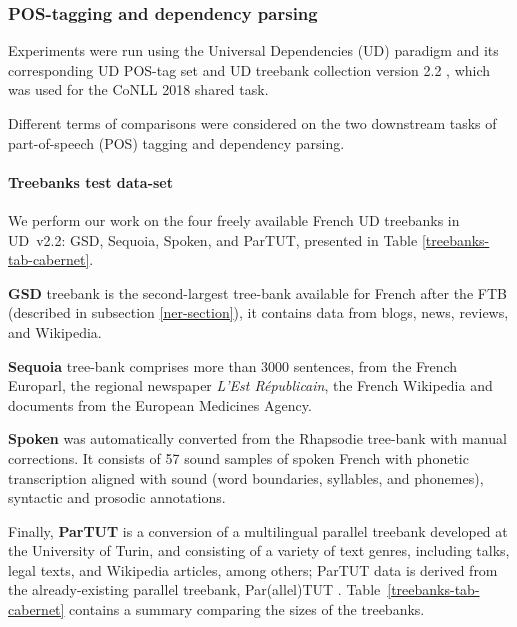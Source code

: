 

\subsubsection{POS-tagging and dependency parsing}


Experiments were run using the Universal Dependencies (UD) paradigm and its corresponding UD POS-tag set \citep{petrov-etal-2012-universal} and UD treebank collection version 2.2 \citep{nivre-etal-2018-universal}, which was used for the CoNLL 2018 shared task.

Different terms of comparisons were considered on the two downstream tasks of part-of-speech (POS) tagging and dependency parsing.
\paragraph{Treebanks test data-set}
We perform our work on the four freely available French UD treebanks in UD~v2.2: GSD, Sequoia, Spoken, and ParTUT, presented in Table \ref{treebanks-tab-cabernet}.

\textbf{GSD} treebank \citep{mcdonald-etal-2013-universal} is the second-largest tree-bank available for French after the FTB (described in subsection \ref{ner-section}), it contains data from blogs, news, reviews, and Wikipedia.

\textbf{Sequoia} tree-bank %
\citep{candito-etal-2014-deep} comprises more than 3000 sentences, from the French Europarl, the regional newspaper \emph{L’Est Républicain}, the French Wikipedia and documents from the European Medicines Agency.

\textbf{Spoken} was automatically converted from the Rhapsodie tree-bank  %
\citep{lacheret-etal-2014-rhapsodie} with manual corrections. It consists of 57 sound samples of spoken French with phonetic transcription aligned with sound (word boundaries, syllables, and phonemes), syntactic and prosodic annotations.

Finally, \textbf{ParTUT} is a conversion of a multilingual parallel treebank developed at the University of Turin, and consisting of a variety of text genres, including talks, legal texts, and Wikipedia articles, among others; ParTUT data is derived from the already-existing parallel treebank, Par(allel)TUT \citep{sanguinetti-Bosco-2015-parttut}. Table~\ref{treebanks-tab-cabernet} contains a summary comparing the sizes of the treebanks.%

